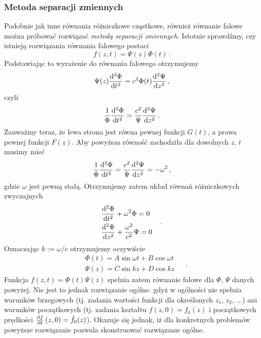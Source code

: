 \documentclass[../main.tex]{subfiles}
\begin{document}
        \subsubsection{Metoda separacji zmiennych}
        Podobnie jak inne równania różniczkowe cząstkowe, również równanie falowe można próbować rozwiązać \textit{metodą separacji zmiennych}. Istotnie sprawdźmy, czy istnieją rozwiązania równania falowego postaci
        \begin{equation*}
            f(z,t)=\Psi(z)\Phi(t)\,.
        \end{equation*}
        Podstawiając to wyrażenie do równania falowego otrzymujemy
        \begin{equation*}
            \Psi(z)\dv[2]{\Phi}{t}=c^2\Phi(t)\dv[2]{\Psi}{z}\,,
        \end{equation*}
        czyli
        \begin{equation*}
            \frac{1}{\Phi}\dv[2]{\Phi}{t}=\frac{c^2}{\Psi}\dv[2]{\Psi}{z}\,.
        \end{equation*}
        Zauważmy teraz, że lewa strona jest równa pewnej funkcji \(G(t)\), a prawa pewnej funkcji \(F(z)\). Aby powyższa równość zachodziła dla dowolnych \(z\), \(t\) musimy mieć
        \begin{equation*}
            \frac{1}{\Phi}\dv[2]{\Phi}{t}=\frac{c^2}{\Psi}\dv[2]{\Psi}{z}=-\omega^2\,,
        \end{equation*}
        gdzie \(\omega\) jest pewną stałą. Otrzymujemy zatem układ równań różniczkowych zwyczajnych
        \begin{equation*}
            \begin{split}
                &\dv[2]{\Phi}{t}+\omega^2\Phi=0\\
                &\dv[2]{\Psi}{z}+\frac{\omega^2}{c^2}\Psi=0
            \end{split}\quad\,.
        \end{equation*}
        Oznaczając \(k:=\omega/c\) otrzymujemy oczywiście
        \begin{equation*}
            \begin{split}
                &\Phi(t)=A\sin\omega t+B\cos\omega t\\
                &\Psi(z)=C\sin kz+D\cos kz
            \end{split}\quad\,.
        \end{equation*}
        Funkcja \(f(z,t)=\Phi(t)\Psi(z)\) spełnia zatem równanie falowe dla \(\Phi\), \(\Psi\) danych powyżej. Nie jest to jednak rozwiązanie ogólne. gdyż w ogólności nie spełnia warunków brzegowych (tj. zadania wartości funkcji dla określonych \(z_1\), \(z_2\), ...) ani warunków początkowych (tj. zadania kształtu \(f(z,0)=f_0(z)\) i początkowych prędkości \(\pdv{f}{t}\,(z,0)=\dot{f}_0(z)\)). Okazuje się jednak, iż dla konkretnych problemów powyższe rozwiązanie pozwala skonstruować rozwiązanie ogólne.
\end{document}
